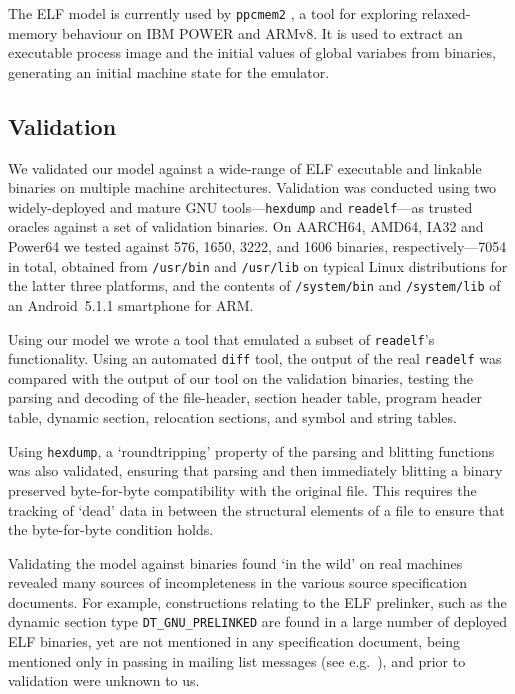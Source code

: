 \documentclass[preprint,10pt]{sigplanconf-pldi16}
\begin{document}
The ELF model is currently used by  \texttt{ppcmem2} \cite{gray-integrated-2015,FGP16}, a tool for exploring
relaxed-memory behaviour on IBM POWER and ARMv8. It is used to extract an executable process image and the initial values of global variabes from binaries, generating an initial machine state for the emulator.

\subsection{Validation}
\label{subsect.elf.validation}

We validated our model against a wide-range of ELF executable and linkable binaries on multiple machine architectures.
Validation was conducted using two widely-deployed and mature GNU tools---\texttt{hexdump} and \texttt{readelf}---as trusted oracles against a set of validation binaries.
On AARCH64, AMD64, IA32 and Power64 we tested against 576, 1650, 3222, and 1606 binaries, respectively---7054 in total, obtained from \texttt{/usr/bin} and \texttt{/usr/lib} on typical Linux distributions for the latter three platforms, and the contents of \texttt{/system/bin} and \texttt{/system/lib} of an Android~5.1.1 smartphone for ARM.

Using our model we wrote a tool that emulated a subset of \texttt{readelf}'s functionality.
Using an automated \texttt{diff} tool, the output of the real \texttt{readelf} was compared with the output of our tool on the validation binaries, testing the parsing and decoding of the file-header, section header table, program header table, dynamic section, relocation sections, and symbol and string tables.

Using \texttt{hexdump}, a `roundtripping' property of the parsing and blitting functions was also validated, ensuring that parsing and then immediately blitting a binary preserved byte-for-byte compatibility with the original file.
This requires the tracking of `dead' data in between the structural elements of a file to ensure that the byte-for-byte condition holds.

Validating the model against binaries found `in the wild' on real machines revealed many sources of incompleteness in the various source specification documents.
For example, constructions relating to the ELF prelinker, such as the dynamic section type \texttt{DT\_GNU\_PRELINKED} are found in a large number of deployed ELF binaries, yet are not mentioned in any specification document, being mentioned only in passing in mailing list messages (see e.g.~\cite{jelinek-prelinker-2001}), and prior to validation were unknown to us.
\end{document}

